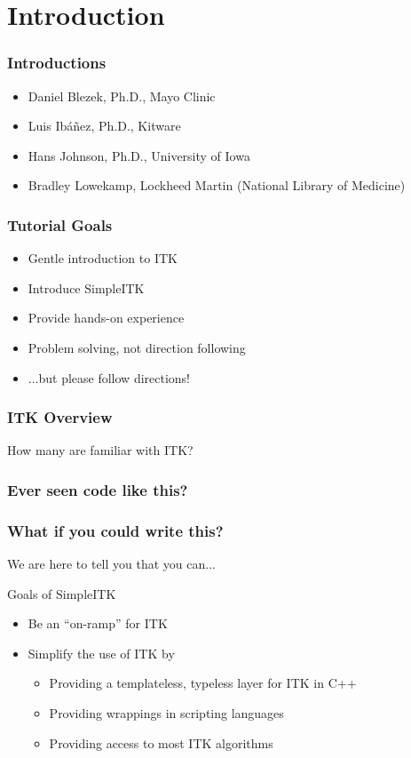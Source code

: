 \section{Introduction}

\begin{frame}
\frametitle{Introductions}

\begin{itemize}
\item Daniel Blezek, Ph.D., Mayo Clinic
\item Luis Ib\'a\~nez, Ph.D., Kitware
\item Hans Johnson, Ph.D., University of Iowa
\item Bradley Lowekamp, Lockheed Martin (National Library of Medicine)
\end{itemize}

\end{frame}

\begin{frame}
\frametitle{Tutorial Goals}
\begin{itemize}
\item Gentle introduction to ITK
\item Introduce SimpleITK
\item Provide hands-on experience
\item Problem solving, not direction following
\item ...but please follow directions!
\end{itemize}
\end{frame}

\begin{frame}
\frametitle{ITK Overview}
How many are familiar with ITK?
\end{frame}

\begin{frame}
\frametitle{Ever seen code like this?}
\begin{center}
\lstcpp

\end{center}
\end{frame}

\begin{frame}
\frametitle{What if you could write this?}
\begin{center}
\lstpython

\end{center}
\pause
We are here to tell you that you can...
\end{frame}

\begin{frame}{Goals of SimpleITK}
\begin{itemize}
\item Be an ``on-ramp'' for ITK
\item Simplify the use of ITK by
  \begin{itemize}
  \item Providing a templateless, typeless layer for ITK in C++
  \item Providing wrappings in scripting languages
  \item Providing access to most ITK algorithms
\end{itemize}
\end{itemize}
\end{frame}


